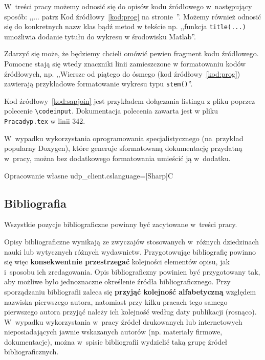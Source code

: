 \documentclass[skorowidz,skroty]{dyplomWEZUT}
\begin{document}
W~treści pracy możemy odnosić się do opisów kodu źródłowego w~następujący sposób: ,,... patrz Kod źródłowy~\ref{kod:prog} na stronie~\pageref{kod:prog}''. Możemy również odnosić się do konkretnych nazw klas bądź metod w tekście np. ,,funkcja \lstinline|title(...)| umożliwia dodanie tytułu do wykresu w środowisku Matlab''.

Zdarzyć się może, że będziemy chcieli omówić pewien fragment kodu źródłowego. Pomocne stają się wtedy znaczniki linii zamieszczone w formatowaniu kodów źródłowych, np. ,,Wiersze od piątego do ósmego (kod źródłowy~\ref{kod:prog}) zawierają przykładowe formatowanie wykresu typu \lstinline|stem()|''.

Kod źródłowy~\ref{kod:sapjoin} jest przykładem dołączania listingu z pliku poprzez polecenie \lstinline|\codeinput|. Dokumentacja polecenia zawarta jest w pliku \lstinline|Pracadyp.tex| w linii 342.

W~wypadku wykorzystania oprogramowania specjalistycznego (na~przykład popularny Doxygen), które generuje sformatowaną dokumentację przydatną w~pracy, można bez dodatkowego formatowania umieścić ją w~dodatku.

%
% 

{Opracowanie własne}{\label{kod:sapjoin}}
{udp_client.cs}{language={[Sharp]C}}

\subsection{Bibliografia}

Wszystkie pozycje bibliograficzne powinny być zacytowane w~treści pracy.

Opisy bibliograficzne wynikają ze zwyczajów stosowanych w~różnych dziedzinach nauki lub wytycznych różnych wydawnictw. Przygotowując bibliografię powinno się więc \textbf{konsekwentnie przestrzegać} kolejności elementów opisu, jak i~sposobu ich zredagowania. Opis bibliograficzny powinien być przygotowany tak, aby możliwe było jednoznaczne określenie źródła bibliograficznego. Przy sporządzaniu bibliografii zaleca się \textbf{przyjąć kolejność alfabetyczną} względem nazwiska pierwszego autora, natomiast przy kilku pracach tego samego pierwszego autora przyjąć należy ich kolejność według daty publikacji (rosnąco). W~wypadku wykorzystania w~pracy źródeł drukowanych lub internetowych nieposiadających jawnie wskazanych autorów (np. materiały firmowe, dokumentacje), można w~spisie bibliografii wydzielić taką grupę źródeł bibliograficznych.
\end{document}
